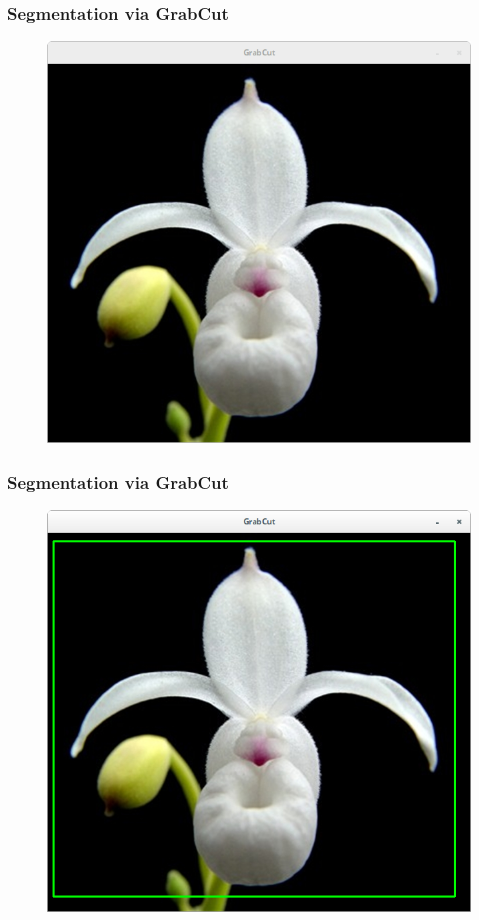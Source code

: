 \documentclass[]{beamer}
\begin{document}
    \begin{frame}[plain]
        \frametitle{Segmentation via GrabCut}

        \begin{figure}[h]
        \centering
        \includegraphics[width=.60\textwidth]{GrabCut_xerophyticum_1}
        \end{figure}
    \end{frame}

    \begin{frame}[plain]
        \frametitle{Segmentation via GrabCut}

        \begin{figure}[h]
        \centering
        \includegraphics[width=.60\textwidth]{GrabCut_xerophyticum_2}
        \end{figure}
    \end{frame}
\end{document}
